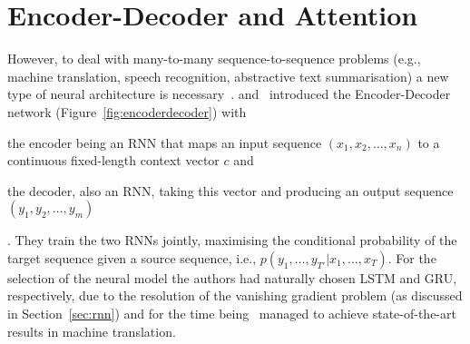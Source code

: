 \section{Encoder-Decoder and Attention}\label{sec:seq2seq}
However, to deal with many-to-many sequence-to-sequence problems (e.g., machine translation, speech recognition, abstractive text summarisation) a new type of neural architecture is necessary~\cite{sutskever2014sequence}.
and~\cite{cho-etal-2014-learning} introduced the Encoder-Decoder network (Figure~\ref{fig:encoderdecoder}) with \begin{enumerate*}
    \item the encoder being an RNN that maps an input sequence $(x_1, x_2, \dots, x_n)$ to a continuous fixed-length context vector $c$ and
    \item the decoder, also an RNN, taking this vector and producing an output sequence $(y_1, y_2, \dots, y_m)$
\end{enumerate*}.
They train the two RNNs jointly, maximising the conditional probability of the target sequence given a source sequence, i.e., $p(y_1, \ldots, y_{T'} | x_1, \ldots, x_T)$.
For the selection of the neural model the authors had naturally chosen LSTM and GRU, respectively, due to the resolution of the vanishing gradient problem (as discussed in Section~\ref{sec:rnn}) and for the time being~\cite{sutskever2014sequence} managed to achieve state-of-the-art results in machine translation.


